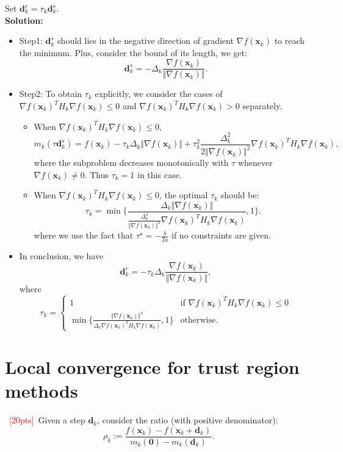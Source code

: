 \documentclass[10pt]{article}
\begin{document}
Set $\bm{d}_{k}^{c} = \tau_{k}\bm{d}^{s}_{k}$.\\
\textbf{Solution:}
\begin{itemize}
	\item Step1: $\bm{d}^{s}_{k} $ should lies in the negative direction of gradient $\nabla f(\bm{x}_{k})$ to reach the minimum. Plus, consider the bound of its length, we get:
		$$\bm{d}^{s}_{k} = - \Delta_k  \frac{\nabla f(\bm{x}_{k})}{\Vert \nabla f(\bm{x}_{k}) \Vert}.$$
	\item Step2: To obtain $\tau_k$ explicitly, we consider the cases of $\nabla f(\bm{x}_{k})^T H_k \nabla f(\bm{x}_{k}) \le 0$ and $\nabla f(\bm{x}_{k})^T H_k \nabla f(\bm{x}_{k}) > 0$ separately.
		\begin{itemize}
			\item When $\nabla f(\bm{x}_{k})^T H_k \nabla f(\bm{x}_{k}) \le 0$, 
				$$m_{k}(\tau\bm{d}^{s}_{k}) = f(\bm{x}_{k}) - \tau_k \Delta_k \Vert \nabla f(\bm{x}_{k}) \Vert + \tau_k^2 \frac{\Delta_k^2}{2\Vert \nabla f(\bm{x}_{k}) \Vert^2}  \nabla f(\bm{x}_{k})^T H_k  \nabla f(\bm{x}_{k}),$$
				where the subproblem decreases monotonically with $\tau$ whenever $\nabla f(\bm{x}_{k}) \ne 0$. Thus $\tau_k=1$ in this case.
			\item When $\nabla f(\bm{x}_{k})^T H_k \nabla f(\bm{x}_{k}) \le 0$, the optimal $\tau_k$ should be:
				$$\tau_k = \min\{ \frac{\Delta_k \Vert \nabla f(\bm{x}_{k}) \Vert}{\frac{\Delta_k^2}{\Vert \nabla f(\bm{x}_{k}) \Vert^2} \nabla f(\bm{x}_{k})^T H_k  \nabla f(\bm{x}_{k})}, 1\}.$$
				where we use the fact that $\tau^\star = -\frac{b}{2a}$ if no constraints are given.
		\end{itemize}
	\item In conclusion, we have $$\bm{d}_{k}^{c} = -\tau_{k}\Delta_k  \frac{\nabla f(\bm{x}_{k})}{\Vert \nabla f(\bm{x}_{k}) \Vert},$$where $$\tau_k =\left\{
																																						\begin{array}{ll}
																																						1&{\text{if $\nabla f(\bm{x}_{k})^T H_k \nabla f(\bm{x}_{k}) \le 0$}}\\
																																						 \min\{ \frac{ \Vert \nabla f(\bm{x}_{k}) \Vert^3}{\Delta_k  \nabla f(\bm{x}_{k})^T H_k  \nabla f(\bm{x}_{k})}, 1\}& {\text{otherwise}.}
																																						\end{array} \right. 
																																						$$
\end{itemize}
\section{Local convergence for trust region methods}
~\textcolor{red}{[20pts]}~Given a step $\bm{d}_{k}$, consider the ratio (with positive denominator):
\begin{equation}
	\rho_{k} := \frac{f(\bm{x}_{k}) - f(\bm{x}_{k} + \bm{d}_{k}) }{m_{k}(\bm{0}) - m_{k}(\bm{d}_{k})}.
\end{equation}
\end{document}
